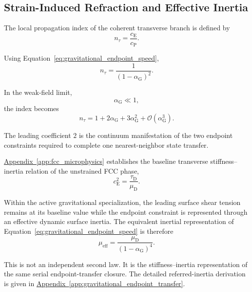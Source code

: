 \subsection{Strain-Induced Refraction and Effective Inertia}

The local propagation index of the coherent transverse branch is defined by
\begin{equation}
    n_{\tau} = \frac{c_{\mathrm{E}}}{c_{\mathrm{P}}}.
\end{equation}

Using Equation~\eqref{eq:gravitational_endpoint_speed},
\begin{equation}
    n_{\tau} = \frac{1}{ \left( 1-\alpha_{\mathrm{G}} \right)^2 }.
    \label{eq:gravitational_refraction_index}
\end{equation}

In the weak-field limit,
\begin{equation}
    \alpha_{\mathrm{G}} \ll 1,
\end{equation}
the index becomes
\begin{equation}
    n_{\tau} = 1 + 2\alpha_{\mathrm{G}} + 3\alpha_{\mathrm{G}}^2 + \mathcal{O} \left( \alpha_{\mathrm{G}}^3 \right).
    \label{eq:gravitational_refraction_expansion}
\end{equation}

The leading coefficient $2$ is the continuum manifestation of the two endpoint constraints required to complete one nearest-neighbor state transfer.

\hyperref[app:fcc_microphysics]{Appendix~\ref*{app:fcc_microphysics}} establishes the baseline transverse stiffness--inertia relation of the unstrained FCC phase,
\begin{equation}
    c_{\mathrm{E}}^2 = \frac{\tau_{\mathrm{D}}}{\mu_{\mathrm{D}}}.
\end{equation}

Within the active gravitational specialization, the leading surface shear tension remains at its baseline value while the endpoint constraint is represented through an effective dynamic surface inertia. The equivalent inertial representation of Equation~\eqref{eq:gravitational_endpoint_speed} is therefore
\begin{equation}
    \mu_{\mathrm{eff}} = \frac{ \mu_{\mathrm{D}} }{ \left( 1-\alpha_{\mathrm{G}} \right)^4 }.
    \label{eq:gravitational_effective_inertia}
\end{equation}

This is not an independent second law. It is the stiffness--inertia representation of the same serial endpoint-transfer closure. The detailed referred-inertia derivation is given in \hyperref[app:gravitational_endpoint_transfer]{Appendix~\ref*{app:gravitational_endpoint_transfer}}.

